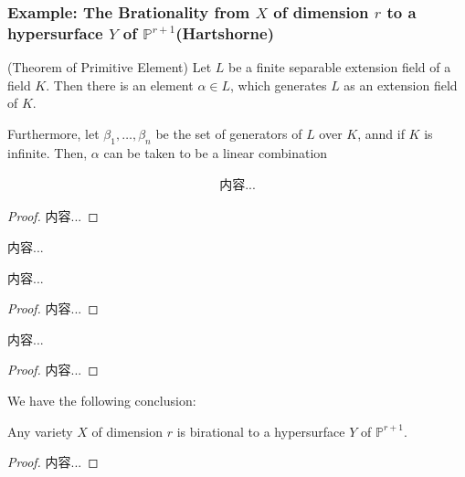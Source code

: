\documentclass[Total.tex]{subfiles}
\begin{document}
		
		
		
		
		\subsubsection{Example: The Brationality from $X$ of dimension $r$ to a hypersurface $Y$ of $\mathbb{P}^{r+1}$(Hartshorne)}
		
		\begin{theorem}
			(Theorem of Primitive Element) Let $L$ be a finite separable extension field of a field $K$. Then there is an element $\alpha\in L$, which generates $L$ as an extension field of $K$.
			
			Furthermore, let $\beta_1,\dots,\beta_n$ be the set of generators of $L$ over $K$, annd if $K$ is infinite. Then, $\alpha$ can be taken to be a linear combination
			
			\begin{gather*}
				内容...
			\end{gather*}
		\end{theorem}
		
		\begin{proof}
			内容...
		\end{proof}
		
		\begin{Def}
			内容...
		\end{Def}
		
		\begin{theorem}
			内容...
		\end{theorem}
		
		\begin{proof}
			内容...
		\end{proof}
		
		\begin{theorem}
			内容...
		\end{theorem}
		
		\begin{proof}
			内容...
		\end{proof}
		
		We have the following conclusion:
		
		\begin{proposition}
			Any variety $X$ of dimension $r$ is birational to a hypersurface $Y$ of $\mathbb{P}^{r+1}$.
		\end{proposition}
		
		\begin{proof}
			内容...
		\end{proof}
		
\end{document}
